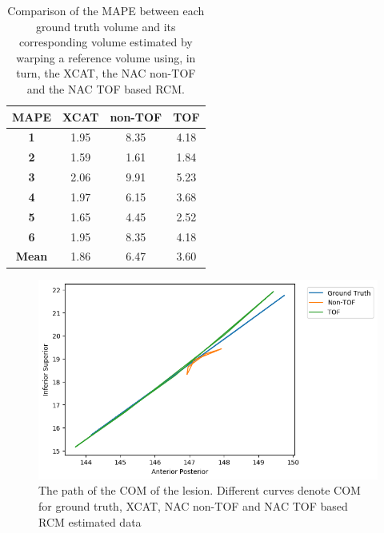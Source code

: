 \documentclass[portrait,color=UCLburgundy,margin=2cm]{uclposter}
\begin{document}
\begin{multicols}{2}

\begin{table}[H]
  \centering
  
  \begin{highlightbox}[UCLlightblue]
    \captionsetup{singlelinecheck=false, justification=centering}
    \caption{Comparison of the \gls{MAPE} between each ground truth volume and its corresponding volume estimated by warping a reference volume using, in turn, the XCAT, the \gls{NAC} non-\gls{TOF} and the \gls{NAC} \gls{TOF} based \gls{RCM}.}
  \end{highlightbox}
  
  \vspace{0.5cm}
  
  \resizebox*{0.6\linewidth}{!}
  {
    \begin{tabular}{||c|ccc||}
      \hline
        \textbf{\gls{MAPE}} & \textbf{XCAT} & \textbf{non-\gls{TOF}} & \textbf{\gls{TOF}} \\
      \hline
        \textbf{1} & 1.95 & 8.35 & 4.18 \\
        \textbf{2} & 1.59 & 1.61 & 1.84 \\
        \textbf{3} & 2.06 & 9.91 & 5.23 \\
        \textbf{4} & 1.97 & 6.15 & 3.68 \\
        \textbf{5} & 1.65 & 4.45 & 2.52 \\
        \textbf{6} & 1.95 & 8.35 & 4.18 \\
      \hline
        \textbf{Mean} & 1.86 & 6.47 & 3.60 \\
      \hline
    \end{tabular}
  }
  \label{tab:MAPE}
\end{table}

\begin{figure}[H]
  \centering
  
  \includegraphics[width=0.8\linewidth]{TOF.png}
  
  \begin{highlightbox}[UCLlightblue]
    \captionsetup{singlelinecheck=false, justification=centering}
    \caption{The path of the \gls{COM} of the lesion. Different curves denote \gls{COM} for ground truth, XCAT, \gls{NAC} non-\gls{TOF} and \gls{NAC} \gls{TOF} based \gls{RCM} estimated data}
  \end{highlightbox}
  
  \label{fig:com_graph}
\end{figure}

\end{multicols}
\end{document}
